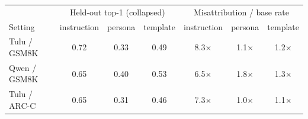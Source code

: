 \begin{tabular}{lcccccc}
\toprule
 & \multicolumn{3}{c}{Held-out top-1 (collapsed)} & \multicolumn{3}{c}{Misattribution / base rate}\\
Setting & instruction & persona & template & instruction & persona & template\\
\midrule
Tulu / GSM8K & 0.72 & 0.33 & 0.49 & 8.3$\times$ & 1.1$\times$ & 1.2$\times$\\
Qwen / GSM8K & 0.65 & 0.40 & 0.53 & 6.5$\times$ & 1.8$\times$ & 1.3$\times$\\
Tulu / ARC-C & 0.65 & 0.31 & 0.46 & 7.3$\times$ & 1.0$\times$ & 1.1$\times$\\
\bottomrule
\end{tabular}
